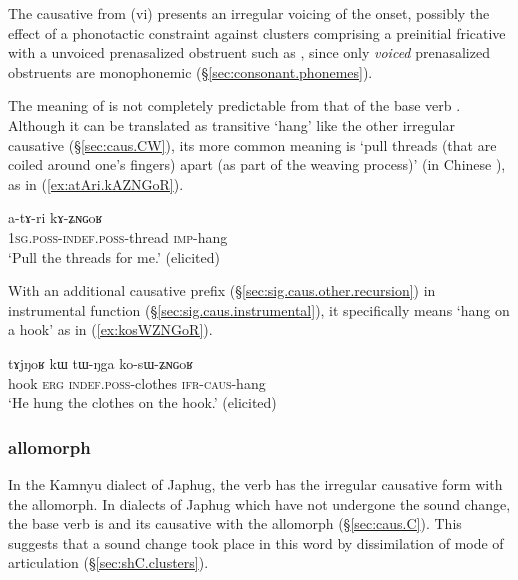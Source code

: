 The causative  from  (vi) presents an irregular voicing of the onset, possibly the effect of a phonotactic constraint against clusters comprising a preinitial fricative with a unvoiced prenasalized obstruent such as , since only \textit{voiced} prenasalized obstruents are monophonemic (§\ref{sec:consonant.phonemes}).

The meaning of  is not completely predictable from that of the base verb . Although it can be translated as transitive `hang' like the other irregular causative   (§\ref{sec:caus.CW}), its more common meaning is `pull threads (that are coiled around one's fingers) apart (as part of the weaving process)' (in Chinese ), as in (\ref{ex:atAri.kAZNGoR}).

\begin{exe} 
\ex \label{ex:atAri.kAZNGoR}
\gll a-tɤ-ri kɤ-ʑɴɢoʁ \\
\textsc{1sg}.\textsc{poss}-\textsc{indef}.\textsc{poss}-thread \textsc{imp}-hang \\
\glt `Pull the threads for me.' (elicited)
\end{exe}

With an additional causative prefix (§\ref{sec:sig.caus.other.recursion}) in instrumental function (§\ref{sec:sig.caus.instrumental}), it specifically means `hang on a hook' as in (\ref{ex:kosWZNGoR}).

\begin{exe} 
\ex \label{ex:kosWZNGoR}
\gll tɤjŋoʁ kɯ tɯ-ŋga ko-sɯ-ʑɴɢoʁ \\
hook \textsc{erg} \textsc{indef}.\textsc{poss}-clothes \textsc{ifr}-\textsc{caus}-hang \\
\glt `He hung the clothes on the hook.' (elicited)
\end{exe}

\subsubsection{ allomorph} \label{sec:caus.j} 
In the Kamnyu dialect of Japhug, the verb  has the irregular causative form  with the  allomorph. In dialects of Japhug which have not undergone the  \fl{}  sound change, the base verb is  and its causative  with the  allomorph (§\ref{sec:caus.C}). This suggests that a sound change  \fl{}  took place in this word by dissimilation of mode of articulation (§\ref{sec:shC.clusters}).

